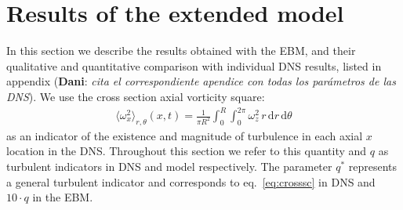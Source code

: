 \documentclass{article}
\DeclareRobustCommand{\dm}[1]{{\color{blue}(\textbf{Dani}: \textit{#1}\xspace)}}
\begin{document}
\section{Results of the extended model}
In this section we describe the results obtained with the EBM, and their qualitative and quantitative comparison with individual DNS results, listed in appendix \dm{cita el correspondiente apendice con todas los parámetros de las DNS}. We use the cross section axial vorticity square:
\begin{align} 
\langle\omega_{x}^{2}\rangle_{r,\theta} \left(x,t\right) =
\frac{1}{\pi R^{2}}\int_{0}^{R}\int_{0}^{2\pi}\omega_{z}^{2}\, r\, \mathrm{d}r\, \mathrm{d}\theta
\label{eq:crosssc}
\end{align}
as an indicator of the existence and magnitude of turbulence in each axial $x$ location in the DNS. Throughout this section we refer to this quantity and $q$ as turbulent indicators in DNS and model respectively. The parameter $q^{*}$ represents a general turbulent indicator and corresponds to eq.~\eqref{eq:crosssc} in DNS and $10 \cdot q$ in the EBM. 
\end{document}
